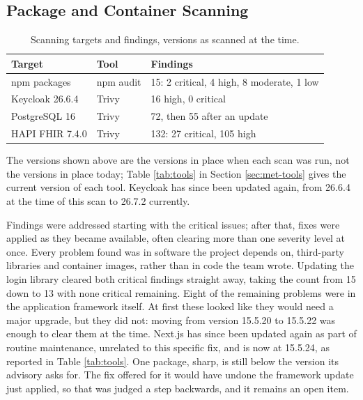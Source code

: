 \subsection{Package and Container Scanning}
\label{sec:result-scanning}

\begin{table}[H]
\centering
\caption{Scanning targets and findings, versions as scanned at the time.}
\label{tab:scan-targets}
\begin{tabular}{|p{3.3cm}|p{2cm}|p{8.6cm}|}
\hline
\textbf{Target} & \textbf{Tool} & \textbf{Findings} \\
\hline
npm packages & npm audit & 15: 2 critical, 4 high, 8 moderate, 1 low \\
\hline
Keycloak 26.6.4 & Trivy & 16 high, 0 critical \\
\hline
PostgreSQL 16 & Trivy & 72, then 55 after an update \\
\hline
HAPI FHIR 7.4.0 & Trivy & 132: 27 critical, 105 high \\
\hline
\end{tabular}
\end{table}

The versions shown above are the versions in place when each scan was run, not the versions in place today; Table \ref{tab:tools} in Section \ref{sec:met-tools} gives the current version of each tool. Keycloak has since been updated again, from 26.6.4 at the time of this scan to 26.7.2 currently.

Findings were addressed starting with the critical issues; after that, fixes were applied as they became available, often clearing more than one severity level at once. Every problem found was in software the project depends on, third-party libraries and container images, rather than in code the team wrote. Updating the login library cleared both critical findings straight away, taking the count from 15 down to 13 with none critical remaining. Eight of the remaining problems were in the application framework itself. At first these looked like they would need a major upgrade, but they did not: moving from version 15.5.20 to 15.5.22 was enough to clear them at the time. Next.js has since been updated again as part of routine maintenance, unrelated to this specific fix, and is now at 15.5.24, as reported in Table \ref{tab:tools}. One package, sharp, is still below the version its advisory asks for. The fix offered for it would have undone the framework update just applied, so that was judged a step backwards, and it remains an open item.

